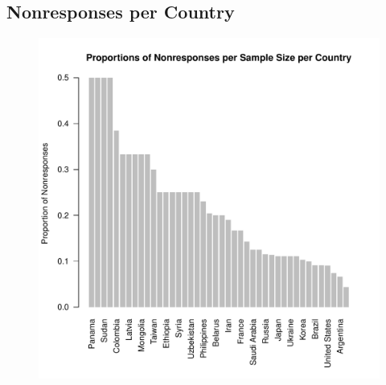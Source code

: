 \documentclass{article}
\theoremstyle{definition}
\begin{document}
\subsection{Nonresponses per Country} \label{sec:plots}
\begin{figure}[H]
\centering
\includegraphics{graphics/missingprops.pdf}
\caption{}
\label{fig:props}
\end{figure}
\end{document}
